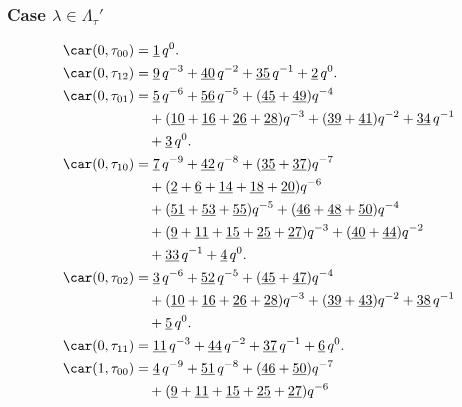
\subsubsection{Case $\lambda\in \Lambda_\tau'$}

\begin{align*}
	\car(0,\tau_{00})
	&=\underline{1}\,q^0.\\
	\car(0,\tau_{12})
	&=\underline{9}\,q^{-3}+\underline{40}\,q^{-2}+\underline{35}\,q^{-1}+\underline{2}\,q^0.\\
	\car(0,\tau_{01})
	&=\underline{5}\,q^{-6}+\underline{56}\,q^{-5}+(\underline{45}+\underline{49})q^{-4}\\
	&\quad+(\underline{10}+\underline{16}+\underline{26}+\underline{28})q^{-3}+(\underline{39}+\underline{41})q^{-2}+\underline{34}\,q^{-1}\\
	&\quad+\underline{3}\,q^0.\\
	\car(0,\tau_{10})
	&=\underline{7}\,q^{-9}+\underline{42}\,q^{-8}+(\underline{35}+\underline{37})q^{-7}\\
	&\quad+(\underline{2}+\underline{6}+\underline{14}+\underline{18}+\underline{20})q^{-6}\\
	&\quad+(\underline{51}+\underline{53}+\underline{55})q^{-5}+(\underline{46}+\underline{48}+\underline{50})q^{-4}\\
	&\quad+(\underline{9}+\underline{11}+\underline{15}+\underline{25}+\underline{27})q^{-3}+(\underline{40}+\underline{44})q^{-2}\\
	&\quad+\underline{33}\,q^{-1}+\underline{4}\,q^0.\\
	\car(0,\tau_{02})
	&=\underline{3}\,q^{-6}+\underline{52}\,q^{-5}+(\underline{45}+\underline{47})q^{-4}\\
	&\quad+(\underline{10}+\underline{16}+\underline{26}+\underline{28})q^{-3}+(\underline{39}+\underline{43})q^{-2}+\underline{38}\,q^{-1}\\
	&\quad+\underline{5}\,q^0.\\
	\car(0,\tau_{11})
	&=\underline{11}\,q^{-3}+\underline{44}\,q^{-2}+\underline{37}\,q^{-1}+\underline{6}\,q^0.\\
	\car(1,\tau_{00})
	&=\underline{4}\,q^{-9}+\underline{51}\,q^{-8}+(\underline{46}+\underline{50})q^{-7}\\
	&\quad+(\underline{9}+\underline{11}+\underline{15}+\underline{25}+\underline{27})q^{-6}\\

\end{align*}
